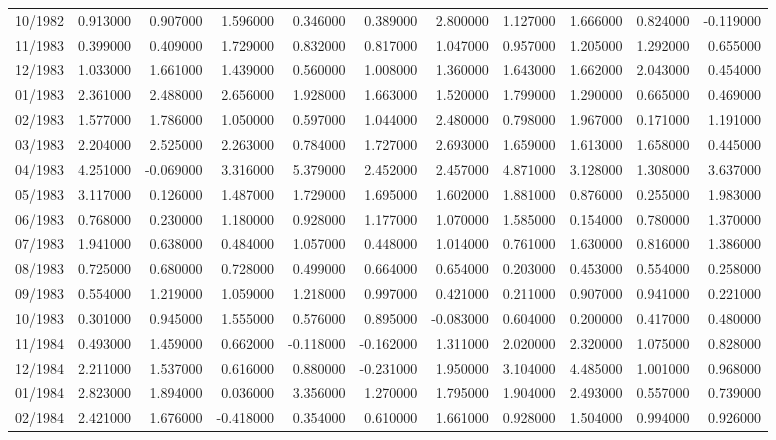 \begin{tabular}{lrrrrrrrrrr}
10/1982 & 0.913000 & 0.907000 & 1.596000 & 0.346000 & 0.389000 & 2.800000 & 1.127000 & 1.666000 & 0.824000 & -0.119000 \\
11/1983 & 0.399000 & 0.409000 & 1.729000 & 0.832000 & 0.817000 & 1.047000 & 0.957000 & 1.205000 & 1.292000 & 0.655000 \\
12/1983 & 1.033000 & 1.661000 & 1.439000 & 0.560000 & 1.008000 & 1.360000 & 1.643000 & 1.662000 & 2.043000 & 0.454000 \\
01/1983 & 2.361000 & 2.488000 & 2.656000 & 1.928000 & 1.663000 & 1.520000 & 1.799000 & 1.290000 & 0.665000 & 0.469000 \\
02/1983 & 1.577000 & 1.786000 & 1.050000 & 0.597000 & 1.044000 & 2.480000 & 0.798000 & 1.967000 & 0.171000 & 1.191000 \\
03/1983 & 2.204000 & 2.525000 & 2.263000 & 0.784000 & 1.727000 & 2.693000 & 1.659000 & 1.613000 & 1.658000 & 0.445000 \\
04/1983 & 4.251000 & -0.069000 & 3.316000 & 5.379000 & 2.452000 & 2.457000 & 4.871000 & 3.128000 & 1.308000 & 3.637000 \\
05/1983 & 3.117000 & 0.126000 & 1.487000 & 1.729000 & 1.695000 & 1.602000 & 1.881000 & 0.876000 & 0.255000 & 1.983000 \\
06/1983 & 0.768000 & 0.230000 & 1.180000 & 0.928000 & 1.177000 & 1.070000 & 1.585000 & 0.154000 & 0.780000 & 1.370000 \\
07/1983 & 1.941000 & 0.638000 & 0.484000 & 1.057000 & 0.448000 & 1.014000 & 0.761000 & 1.630000 & 0.816000 & 1.386000 \\
08/1983 & 0.725000 & 0.680000 & 0.728000 & 0.499000 & 0.664000 & 0.654000 & 0.203000 & 0.453000 & 0.554000 & 0.258000 \\
09/1983 & 0.554000 & 1.219000 & 1.059000 & 1.218000 & 0.997000 & 0.421000 & 0.211000 & 0.907000 & 0.941000 & 0.221000 \\
10/1983 & 0.301000 & 0.945000 & 1.555000 & 0.576000 & 0.895000 & -0.083000 & 0.604000 & 0.200000 & 0.417000 & 0.480000 \\
11/1984 & 0.493000 & 1.459000 & 0.662000 & -0.118000 & -0.162000 & 1.311000 & 2.020000 & 2.320000 & 1.075000 & 0.828000 \\
12/1984 & 2.211000 & 1.537000 & 0.616000 & 0.880000 & -0.231000 & 1.950000 & 3.104000 & 4.485000 & 1.001000 & 0.968000 \\
01/1984 & 2.823000 & 1.894000 & 0.036000 & 3.356000 & 1.270000 & 1.795000 & 1.904000 & 2.493000 & 0.557000 & 0.739000 \\
02/1984 & 2.421000 & 1.676000 & -0.418000 & 0.354000 & 0.610000 & 1.661000 & 0.928000 & 1.504000 & 0.994000 & 0.926000 \\

\end{tabular}
